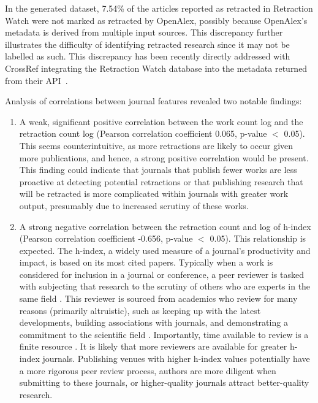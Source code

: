 \documentclass[pdflatex,sn-mathphys-num]{sn-jnl}
\begin{document}
In the generated dataset, 7.54\% of the articles reported as retracted in Retraction Watch were not marked as retracted by OpenAlex, possibly because OpenAlex's metadata is derived from multiple input sources. This discrepancy further illustrates the difficulty of identifying retracted research since it may not be labelled as such. This discrepancy has been recently directly addressed with CrossRef integrating the Retraction Watch database into the metadata returned from their API~\cite{rittman_retraction_2025}.

Analysis of correlations between journal features revealed two notable findings:
\begin{enumerate}
	\item A weak, significant positive correlation between the work count log and the retraction count log (Pearson correlation coefficient 0.065, p-value \(<\) 0.05). This seems counterintuitive, as more retractions are likely to occur given more publications, and hence, a strong positive correlation would be present. This finding could indicate that journals that publish fewer works are less proactive at detecting potential retractions or that publishing research that will be retracted is more complicated within journals with greater work output, presumably due to increased scrutiny of these works.

	\item A strong negative correlation between the retraction count and log of h-index (Pearson correlation coefficient -0.656, p-value \(<\) 0.05). This relationship is expected. The h-index, a widely used measure of a journal's productivity and impact, is based on its most cited papers. Typically when a work is considered for inclusion in a journal or conference, a peer reviewer is tasked with subjecting that research to the scrutiny of others who are experts in the same field \cite{banks_thoughts_2018}. This reviewer is sourced from academics who review for many reasons (primarily altruistic), such as keeping up with the latest developments, building associations with journals, and demonstrating a commitment to the scientific field \cite{steer_peer_2021}. Importantly, time available to review is a finite resource \cite{warne_rewarding_2016}. It is likely that more reviewers are available for greater h-index journals. Publishing venues with higher h-index values potentially have a more rigorous peer review process, authors are more diligent when submitting to these journals, or higher-quality journals attract better-quality research.

\end{enumerate}
\end{document}
